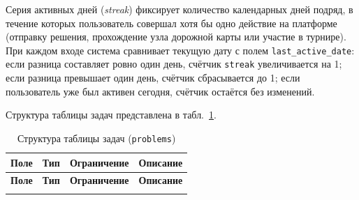 Серия активных дней (\textit{streak}) фиксирует количество календарных дней подряд,
в течение которых пользователь совершал хотя бы одно действие на платформе
(отправку решения, прохождение узла дорожной карты или участие в турнире).
При каждом входе система сравнивает текущую дату с полем \texttt{last\_active\_date}:
если разница составляет ровно один день, счётчик \texttt{streak} увеличивается на 1;
если разница превышает один день, счётчик сбрасывается до 1; если пользователь уже
был активен сегодня, счётчик остаётся без изменений.

Структура таблицы задач представлена в табл.~\ref{tab:db_problems}.

\begin{longtable}{|l|l|p{3.5cm}|p{5.5cm}|}
	\caption{Структура таблицы задач (\texttt{problems})} \label{tab:db_problems} \\

	\hline
	\textbf{Поле}     & \textbf{Тип} & \textbf{Ограничение} & \textbf{Описание}                        \\ \hline
	\endfirsthead

	\tabcont{\ref{tab:db_problems}}
	\textbf{Поле}     & \textbf{Тип} & \textbf{Ограничение} & \textbf{Описание}                        \\ \hline
	\endhead

	\hline
	\endfoot

	\hline
	\endlastfoot


\end{longtable}
